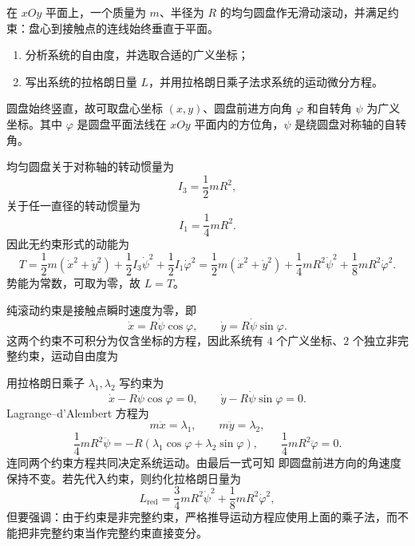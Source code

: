 \begin{question}[圆盘作无滑动滚动]
在 $xOy$ 平面上，一个质量为 $m$、半径为 $R$ 的均匀圆盘作无滑动滚动，并满足约束：盘心到接触点的连线始终垂直于平面。
\begin{enumerate}
  \item 分析系统的自由度，并选取合适的广义坐标；
  \item 写出系统的拉格朗日量 $L$，并用拉格朗日乘子法求系统的运动微分方程。
\end{enumerate}

\begin{solution}
圆盘始终竖直，故可取盘心坐标 $(x,y)$、圆盘前进方向角 $\varphi$ 和自转角 $\psi$ 为广义坐标。其中 $\varphi$ 是圆盘平面法线在 $xOy$ 平面内的方位角，$\psi$ 是绕圆盘对称轴的自转角。

均匀圆盘关于对称轴的转动惯量为
\[
  I_3=\frac12mR^2,
\]
关于任一直径的转动惯量为
\[
  I_1=\frac14mR^2.
\]
因此无约束形式的动能为
\[
  T=\frac12m(\dot x^2+\dot y^2)
    +\frac12 I_3\dot\psi^2+\frac12 I_1\dot\varphi^2
  =\frac12m(\dot x^2+\dot y^2)
    +\frac14mR^2\dot\psi^2+\frac18mR^2\dot\varphi^2 .
\]
势能为常数，可取为零，故 $L=T$。

纯滚动约束是接触点瞬时速度为零，即
\[
  \dot x=R\dot\psi\cos\varphi,
  \qquad
  \dot y=R\dot\psi\sin\varphi .
\]
这两个约束不可积分为仅含坐标的方程，因此系统有 $4$ 个广义坐标、$2$ 个独立非完整约束，运动自由度为

用拉格朗日乘子 $\lambda_1,\lambda_2$ 写约束为
\[
  \dot x-R\dot\psi\cos\varphi=0,
  \qquad
  \dot y-R\dot\psi\sin\varphi=0 .
\]
Lagrange--d'Alembert 方程为
\[
  m\ddot x=\lambda_1,
  \qquad
  m\ddot y=\lambda_2,
\]
\[
  \frac14mR^2\ddot\psi
  =-R(\lambda_1\cos\varphi+\lambda_2\sin\varphi),
  \qquad
  \frac14mR^2\ddot\varphi=0.
\]
连同两个约束方程共同决定系统运动。由最后一式可知
即圆盘前进方向的角速度保持不变。若先代入约束，则约化拉格朗日量为
\[
  L_{\mathrm{red} }
  =\frac34mR^2\dot\psi^2+\frac18mR^2\dot\varphi^2,
\]
但要强调：由于约束是非完整约束，严格推导运动方程应使用上面的乘子法，而不能把非完整约束当作完整约束直接变分。
\end{solution}

\end{question}

